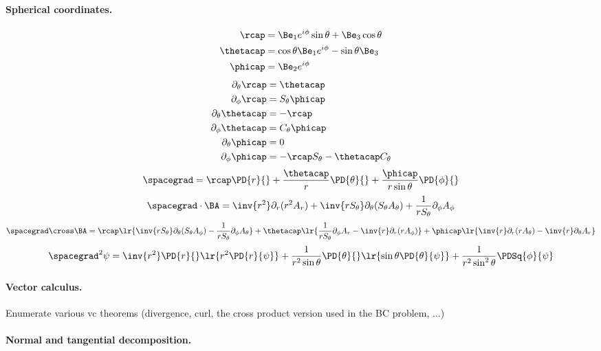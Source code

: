 \paragraph{Spherical coordinates.}
%
\begin{equation}\label{eqn:usefulFormulas:840}
\begin{aligned}
\rcap &= \Be_1 e^{i\phi} \sin\theta + \Be_3 \cos\theta \\
\thetacap &= \cos\theta \Be_1 e^{i\phi} - \sin\theta \Be_3 \\
\phicap &= \Be_2 e^{i\phi}
\end{aligned}
\end{equation}
%
\begin{equation}\label{eqn:usefulFormulas:860}
\begin{aligned}
\partial_{\theta}{\rcap}      &= \thetacap \\
\partial_{\phi}{\rcap}        &= S_\theta \phicap \\
\partial_{\theta}{\thetacap}  &= -\rcap \\
\partial_{\phi}{\thetacap}    &= C_\theta \phicap \\
\partial_{\theta}{\phicap}    &= 0 \\
\partial_{\phi}{\phicap}      &= -\rcap S_\theta - \thetacap C_\theta
\end{aligned}
\end{equation}
%
\begin{equation}\label{eqn:usefulFormulas:880}
\spacegrad
=
\rcap \PD{r}{} +
\frac{\thetacap}{r} \PD{\theta}{} +
\frac{\phicap}{r\sin\theta} \PD{\phi}{}
\end{equation}
%
\begin{equation}\label{eqn:usefulFormulas:900}
\spacegrad \cdot \BA
=
\inv{r^2} \partial_r (r^2 A_r)
+ \inv{r S_\theta} \partial_\theta (S_\theta A_\theta)
+ \frac{1}{r S_\theta} \partial_\phi A_\phi
\end{equation}
%
\begin{equation}\label{eqn:usefulFormulas:920}
\spacegrad \cross \BA
=
   \rcap \lr{
       \inv{r S_\theta} \partial_\theta (S_\theta A_\phi)
      -\frac{1}{r S_\theta} \partial_\phi A_\theta
   }
   + \thetacap \lr{
      \frac{1}{r S_\theta} \partial_\phi A_r
      -\inv{r} \partial_r (r A_\phi)
   }
   + \phicap \lr{
        \inv{r} \partial_r (r A_\theta)
      - \inv{r} \partial_\theta A_r
   }
\end{equation}
%
\begin{equation}\label{eqn:usefulFormulas:940}
\spacegrad^2 \psi
=
    \inv{r^2} \PD{r}{} \lr{ r^2 \PD{r}{ \psi} }
   + \frac{1}{r^2 \sin\theta} \PD{\theta}{} \lr{ \sin\theta \PD{\theta}{ \psi } }
   + \frac{1}{r^2 \sin^2\theta} \PDSq{\phi}{ \psi}
\end{equation}
%
\paragraph{Vector calculus.}
%
Enumerate various vc theorems (divergence, curl, the cross product version used in the BC problem, ...)
%
\paragraph{Normal and tangential decomposition.}
%

